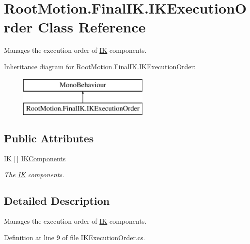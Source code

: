 \hypertarget{class_root_motion_1_1_final_i_k_1_1_i_k_execution_order}{}\section{Root\+Motion.\+Final\+I\+K.\+I\+K\+Execution\+Order Class Reference}
\label{class_root_motion_1_1_final_i_k_1_1_i_k_execution_order}


Manages the execution order of \mbox{\hyperlink{class_root_motion_1_1_final_i_k_1_1_i_k}{IK}} components.  


Inheritance diagram for Root\+Motion.\+Final\+I\+K.\+I\+K\+Execution\+Order\+:\begin{figure}[H]
\begin{center}
\leavevmode
\includegraphics[height=2.000000cm]{class_root_motion_1_1_final_i_k_1_1_i_k_execution_order}
\end{center}
\end{figure}
\subsection*{Public Attributes}
\begin{DoxyCompactItemize}
\item 
\mbox{\hyperlink{class_root_motion_1_1_final_i_k_1_1_i_k}{IK}} \mbox{[}$\,$\mbox{]} \mbox{\hyperlink{class_root_motion_1_1_final_i_k_1_1_i_k_execution_order_a196c759e4337cd52978b841cc1467780}{I\+K\+Components}}
\begin{DoxyCompactList}\small\item\em The \mbox{\hyperlink{class_root_motion_1_1_final_i_k_1_1_i_k}{IK}} components. \end{DoxyCompactList}\end{DoxyCompactItemize}


\subsection{Detailed Description}
Manages the execution order of \mbox{\hyperlink{class_root_motion_1_1_final_i_k_1_1_i_k}{IK}} components. 



Definition at line 9 of file I\+K\+Execution\+Order.\+cs.



